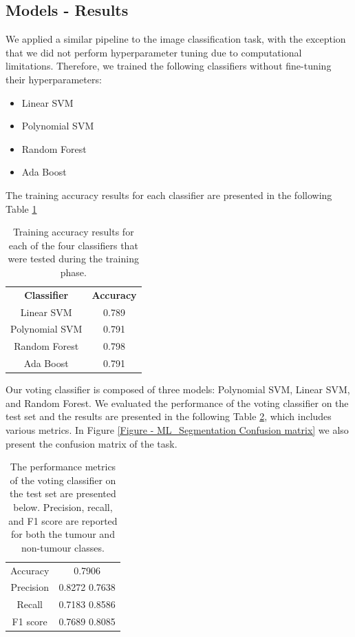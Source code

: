 \subsection{Models - Results}
We applied a similar pipeline to the image classification task, with the exception that we did not perform hyperparameter tuning due to computational limitations. Therefore, we trained the following classifiers without fine-tuning their hyperparameters:
\begin{itemize}
\item Linear SVM
\item Polynomial SVM
\item Random Forest
\item Ada Boost
\end{itemize}
The training accuracy results for each classifier are presented in the following Table \ref{Table - ML_Segmentation Training accuracy results for each of the 4 classifiers that have been tested}
\begin{table}[H]
\centering
\begin{tabular}{cc}
\textbf{Classifier}     & \textbf{Accuracy} \\
Linear SVM              & 0.789             \\
Polynomial SVM          & 0.791             \\
Random Forest           & 0.798             \\
Ada Boost               & 0.791            
\end{tabular}
\caption{Training accuracy results for each of the four classifiers that were tested during the training phase.}
\label{Table - ML_Segmentation Training accuracy results for each of the 4 classifiers that have been tested}
\end{table}
Our voting classifier is composed of three models: Polynomial SVM, Linear SVM, and Random Forest. We evaluated the performance of the voting classifier on the test set and the results are presented in the following Table \ref{Table - ML_Segmentation Test accuracy-precision-recall-f1 results for voting classifier}, which includes various metrics. In Figure \ref{Figure - ML_Segmentation Confusion matrix} we also present the confusion matrix of the task.
\begin{table}[H]
\centering
\begin{tabular}{cc}
Accuracy  & 0.7906        \\
Precision & 0.8272 0.7638 \\
Recall    & 0.7183 0.8586 \\
F1 score  & 0.7689 0.8085
\end{tabular}
\caption{The performance metrics of the voting classifier on the test set are presented below. Precision, recall, and F1 score are reported for both the tumour and non-tumour classes.}
\label{Table - ML_Segmentation Test accuracy-precision-recall-f1 results for voting classifier}
\end{table}
